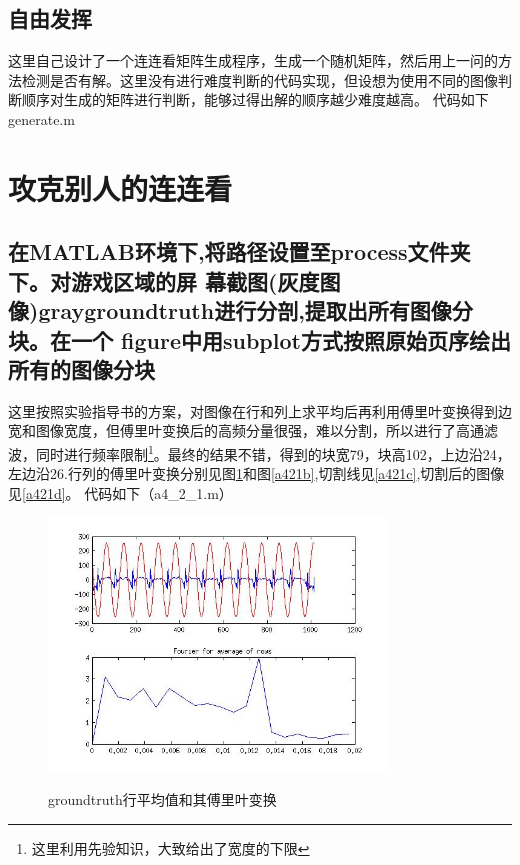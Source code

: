 \documentclass{ctexart}
\begin{document}
\subsection{自由发挥}
这里自己设计了一个连连看矩阵生成程序，生成一个随机矩阵，然后用上一问的方法检测是否有解。这里没有进行难度判断的代码实现，但设想为使用不同的图像判断顺序对生成的矩阵进行判断，能够过得出解的顺序越少难度越高。
代码如下generate.m

\section{攻克别人的连连看}
\subsection{ 
在MATLAB环境下,将路径设置至process文件夹下。对游戏区域的屏
幕截图(灰度图像)graygroundtruth进行分剖,提取出所有图像分块。在一个
figure中用subplot方式按照原始页序绘出所有的图像分块}
这里按照实验指导书的方案，对图像在行和列上求平均后再利用傅里叶变换得到边宽和图像宽度，但傅里叶变换后的高频分量很强，难以分割，所以进行了高通滤波，同时进行频率限制\footnote{这里利用先验知识，大致给出了宽度的下限}。最终的结果不错，得到的块宽79，块高102，上边沿24，左边沿26.行列的傅里叶变换分别见图\ref{a421a}和图\ref{a421b},切割线见\ref{a421c},切割后的图像见\ref{a421d}。
代码如下（a4\_2\_1.m）

\begin{figure}
    \centering
    \includegraphics[width=0.8\textwidth]{process/a421a.jpg}\\
    \caption{groundtruth行平均值和其傅里叶变换\label{a421a}}
\end{figure}
\end{document}
